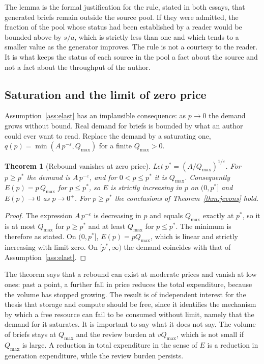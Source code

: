\documentclass[11pt]{article}
\theoremstyle{plain}
\newtheorem{theorem}{Theorem}[section]
\theoremstyle{definition}
\theoremstyle{remark}
\begin{document}
The lemma is the formal justification for the rule, stated in both essays, that generated briefs remain outside the source pool. If they were admitted, the fraction of the pool whose status had been established by a reader would be bounded above by $s/a$, which is strictly less than one and which tends to a smaller value as the generator improves. The rule is not a courtesy to the reader. It is what keeps the status of each source in the pool a fact about the source and not a fact about the throughput of the author.

\subsection{Saturation and the limit of zero price}\label{sec:sat}

Assumption~\ref{ass:elast} has an implausible consequence: as $p\to0$ the demand grows without bound. Real demand for briefs is bounded by what an author could ever want to read. Replace the demand by a saturating one, $q(p)=\min(A\,p^{-\varepsilon},Q_{\max})$ for a finite $Q_{\max}>0$.

\begin{theorem}[Rebound vanishes at zero price]\label{thm:sat}
Let $p^{*}=(A/Q_{\max})^{1/\varepsilon}$. For $p\ge p^{*}$ the demand is $A\,p^{-\varepsilon}$, and for $0<p\le p^{*}$ it is $Q_{\max}$. Consequently $E(p)=p\,Q_{\max}$ for $p\le p^{*}$, so $E$ is strictly increasing in $p$ on $(0,p^{*}]$ and $E(p)\to0$ as $p\to0^{+}$. For $p\ge p^{*}$ the conclusions of Theorem~\ref{thm:jevons} hold.
\end{theorem}

\begin{proof}
The expression $A\,p^{-\varepsilon}$ is decreasing in $p$ and equals $Q_{\max}$ exactly at $p^{*}$, so it is at most $Q_{\max}$ for $p\ge p^{*}$ and at least $Q_{\max}$ for $p\le p^{*}$. The minimum is therefore as stated. On $(0,p^{*}]$, $E(p)=pQ_{\max}$, which is linear and strictly increasing with limit zero. On $[p^{*},\infty)$ the demand coincides with that of Assumption~\ref{ass:elast}. \qedhere
\end{proof}

The theorem says that a rebound can exist at moderate prices and vanish at low ones: past a point, a further fall in price reduces the total expenditure, because the volume has stopped growing. The result is of independent interest for the thesis that storage and compute should be free, since it identifies the mechanism by which a free resource can fail to be consumed without limit, namely that the demand for it saturates. It is important to say what it does not say. The volume of briefs stays at $Q_{\max}$ and the review burden at $vQ_{\max}$, which is not small if $Q_{\max}$ is large. A reduction in total expenditure in the sense of $E$ is a reduction in generation expenditure, while the review burden persists.
\end{document}

